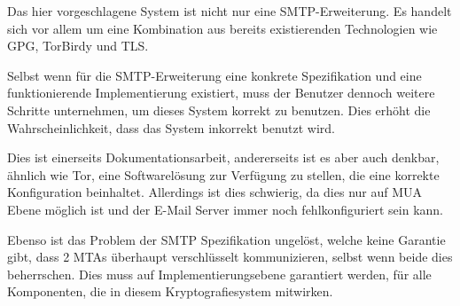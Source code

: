 Das hier vorgeschlagene System ist nicht nur eine SMTP-Erweiterung. Es handelt sich vor allem um eine Kombination aus bereits existierenden Technologien wie GPG, TorBirdy und TLS.

Selbst wenn für die SMTP-Erweiterung eine konkrete Spezifikation und eine funktionierende Implementierung existiert, muss der Benutzer dennoch weitere Schritte unternehmen, um dieses System korrekt zu benutzen. Dies erhöht die Wahrscheinlichkeit, dass das System inkorrekt benutzt wird.

Dies ist einerseits Dokumentationsarbeit, andererseits ist es aber auch denkbar, ähnlich wie Tor, eine Softwarelösung zur Verfügung zu stellen, die eine korrekte Konfiguration beinhaltet. Allerdings ist dies schwierig, da dies nur auf MUA Ebene möglich ist und der E-Mail Server immer noch fehlkonfiguriert sein kann.

Ebenso ist das Problem der SMTP Spezifikation ungelöst, welche keine Garantie gibt, dass 2 MTAs überhaupt verschlüsselt kommunizieren, selbst wenn beide dies beherrschen. Dies muss auf Implementierungsebene garantiert werden, für alle Komponenten, die in diesem Kryptografiesystem mitwirken.